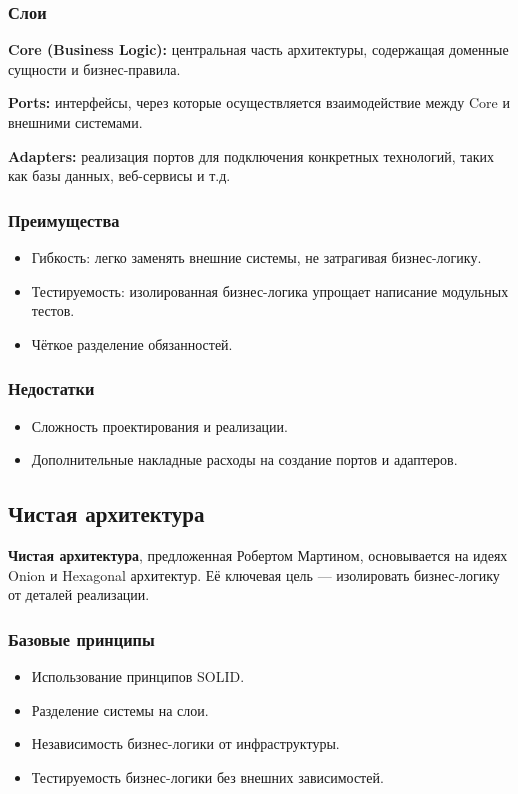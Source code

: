 \subsubsection{Слои}
\textbf{Core (Business Logic):} центральная часть архитектуры, содержащая доменные сущности и бизнес-правила.

\textbf{Ports:} интерфейсы, через которые осуществляется взаимодействие между Core и внешними системами.

\textbf{Adapters:} реализация портов для подключения конкретных технологий, таких как базы данных, веб-сервисы и т.д.

\subsubsection{Преимущества}
\begin{itemize}
    \item Гибкость: легко заменять внешние системы, не затрагивая бизнес-логику.
    \item Тестируемость: изолированная бизнес-логика упрощает написание модульных тестов.
    \item Чёткое разделение обязанностей.
\end{itemize}

\subsubsection{Недостатки}
\begin{itemize}
    \item Сложность проектирования и реализации.
    \item Дополнительные накладные расходы на создание портов и адаптеров.
\end{itemize}

\subsection{Чистая архитектура}
\textbf{Чистая архитектура}, предложенная Робертом Мартином, основывается на идеях Onion и Hexagonal архитектур. Её ключевая цель — изолировать бизнес-логику от деталей реализации.

\subsubsection{Базовые принципы}
\begin{itemize}
    \item Использование принципов SOLID.
    \item Разделение системы на слои.
    \item Независимость бизнес-логики от инфраструктуры.
    \item Тестируемость бизнес-логики без внешних зависимостей.
\end{itemize}

